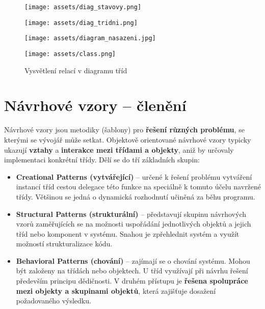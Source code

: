 \begin{figure}[H]
    \centering
    \texttt{[image: assets/diag\_stavovy.png]}
\end{figure}
\begin{figure}
    \centering
    \begin{minipage}{.5\textwidth}
        \centering
        \texttt{[image: assets/diag\_tridni.png]}
    \end{minipage}%
    \begin{minipage}{.5\textwidth}
        \centering
        \texttt{[image: assets/diagram\_nasazeni.jpg]}
    \end{minipage}
\end{figure}

\begin{figure}[H]
    \centering
    \texttt{[image: assets/class.png]}
    \caption{Vysvětlení relací v diagramu tříd}
\end{figure}

\section{Návrhové vzory -- členění}
Návrhové vzory jsou metodiky (šablony) pro \textbf{řešení různých problému}, se kterými se vývojář může setkat. Objektově orientované návrhové vzory typicky ukazují \textbf{vztahy} a \textbf{interakce mezi třídami a objekty}, aniž by určovaly implementaci konkrétní třídy. Dělí se do tří základních skupin:
\begin{itemize}
    \item \textbf{Creational Patterns (vytvářející)} -- určené k řešení problému vytváření instancí tříd cestou delegace této funkce na speciálně k tomuto účelu navržené třídy. Většinou se jedná o dynamická rozhodnutí učiněná za běhu programu.
    \item \textbf{Structural Patterns (strukturální)} -- představují skupinu návrhových vzorů zaměřujících se na možnosti uspořádání jednotlivých objektů a jejich tříd nebo komponent v systému. Snahou je zpřehlednit systém a využít možností strukturalizace kódu.
    \item \textbf{Behavioral Patterns (chování)} -- zajímají se o chování systému. Mohou být založeny na třídách nebo objektech. U tříd využívají při návrhu řešení především principu dědičnosti. V druhém přístupu je \textbf{řešena spolupráce mezi objekty a skupinami objektů}, která zajišťuje dosažení požadovaného výsledku.
\end{itemize}

